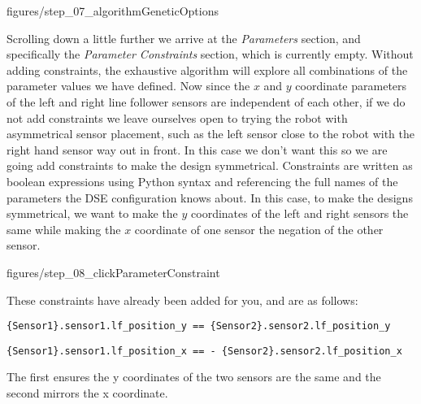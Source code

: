 \documentclass[11pt,a4paper]{../tutorial}
\begin{document}
\begin{instructions}
\begin{center}\begin{annotation}[width=0.7\linewidth,trim=0 0 0 0,clip]{figures/step_07_algorithmGeneticOptions}
    \end{annotation}\end{center}

\newpage

Scrolling down a little further we arrive at the \emph{Parameters} section, and specifically the \emph{Parameter Constraints} section, which is currently empty.  Without adding constraints, the exhaustive algorithm will explore all combinations of the parameter values we have defined.  Now since the $x$ and $y$ coordinate parameters of the left and right line follower sensors are independent of each other, if we do not add constraints we leave ourselves open to trying the robot with asymmetrical sensor placement, such as the left sensor close to the robot with the right hand sensor way out in front.  In this case we don’t want this so we are going add constraints to make the design symmetrical.  Constraints are written as boolean expressions using Python syntax and referencing the full names of the parameters the DSE configuration knows about.  In this case, to make the designs symmetrical, we want to make the $y$ coordinates of the left and right sensors the same while making the $x$ coordinate of one sensor the negation of the other sensor.

\begin{center}\begin{annotation}[width=0.7\linewidth,trim=0 0 0 0,clip]{figures/step_08_clickParameterConstraint}
    \end{annotation}\end{center}

These constraints have already been added for you, and are as follows:

{\small 
\verb|{Sensor1}.sensor1.lf_position_y == {Sensor2}.sensor2.lf_position_y|

\verb|{Sensor1}.sensor1.lf_position_x == - {Sensor2}.sensor2.lf_position_x|
}

The first ensures the y coordinates of the two sensors are the same and the second mirrors the x coordinate.


\end{instructions}
\end{document}
